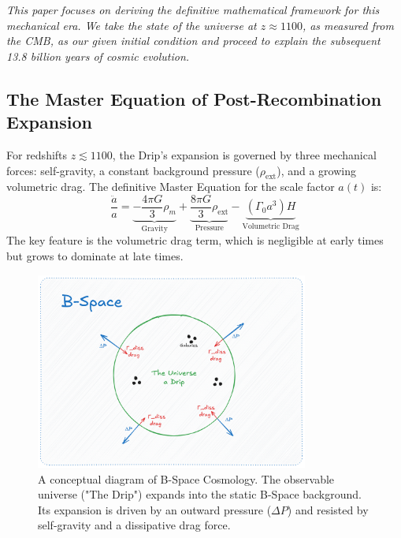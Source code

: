 \documentclass{BSpacePaper} %
\begin{document}
\bigskip %
\noindent
\textit{This paper focuses on deriving the definitive mathematical framework for this mechanical era. We take the state of the universe at $z \approx 1100$, as measured from the CMB, as our given initial condition and proceed to explain the subsequent 13.8 billion years of cosmic evolution.}

\subsection{The Master Equation of Post-Recombination Expansion}
For redshifts $z \lesssim 1100$, the Drip's expansion is governed by three mechanical forces: self-gravity, a constant background pressure ($\rho_{\text{ext}}$), and a growing volumetric drag. The definitive Master Equation for the scale factor $a(t)$ is:
\begin{equation} \label{eq:master_main}
\frac{\ddot{a}}{a} = 
\underbrace{-\frac{4\pi G}{3} \rho_{m}}_{\text{Gravity}} 
+ \underbrace{\frac{8\pi G}{3} \rho_{\text{ext}}}_{\text{Pressure}} 
- \underbrace{(\Gamma_{0} a^3) H}_{\text{Volumetric Drag}}
\end{equation}
The key feature is the volumetric drag term, which is negligible at early times but grows to dominate at late times.

\begin{figure}[h!]
    \centering
    \includegraphics[width=0.8\textwidth]{B-Space_Diagram.png}
    \caption{A conceptual diagram of B-Space Cosmology. The observable universe ("The Drip") expands into the static B-Space background. Its expansion is driven by an outward pressure ($\Delta P$) and resisted by self-gravity and a dissipative drag force.}
    \label{fig:conceptual_diagram}
\end{figure}
\end{document}
